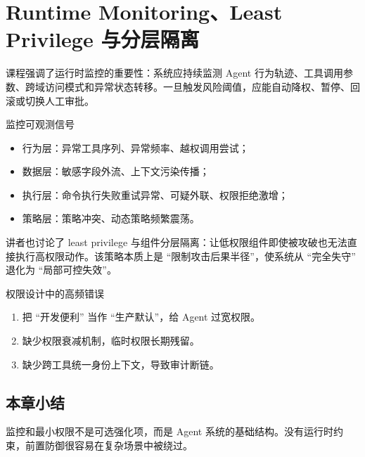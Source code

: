 \section{Runtime Monitoring、Least Privilege 与分层隔离}

课程强调了运行时监控的重要性：系统应持续监测 Agent 行为轨迹、工具调用参数、跨域访问模式和异常状态转移。一旦触发风险阈值，应能自动降权、暂停、回滚或切换人工审批。

\begin{knowledgebox}{监控可观测信号}
\begin{itemize}
    \item 行为层：异常工具序列、异常频率、越权调用尝试；
    \item 数据层：敏感字段外流、上下文污染传播；
    \item 执行层：命令执行失败重试异常、可疑外联、权限拒绝激增；
    \item 策略层：策略冲突、动态策略频繁震荡。
\end{itemize}
\end{knowledgebox}

讲者也讨论了 least privilege 与组件分层隔离：让低权限组件即使被攻破也无法直接执行高权限动作。该策略本质上是 ``限制攻击后果半径''，使系统从 ``完全失守'' 退化为 ``局部可控失效''。

\begin{warningbox}{权限设计中的高频错误}
\begin{enumerate}
    \item 把 ``开发便利'' 当作 ``生产默认''，给 Agent 过宽权限。
    \item 缺少权限衰减机制，临时权限长期残留。
    \item 缺少跨工具统一身份上下文，导致审计断链。
\end{enumerate}
\end{warningbox}

\subsection{本章小结}
监控和最小权限不是可选强化项，而是 Agent 系统的基础结构。没有运行时约束，前置防御很容易在复杂场景中被绕过。

